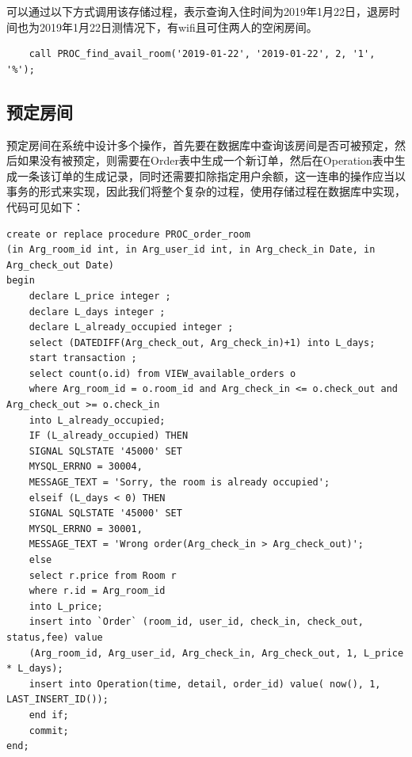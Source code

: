 \documentclass{myreport}
\begin{document}
可以通过以下方式调用该存储过程，表示查询入住时间为2019年1月22日，退房时间也为2019年1月22日测情况下，有wifi且可住两人的空闲房间。

\begin{verbatim}
    call PROC_find_avail_room('2019-01-22', '2019-01-22', 2, '1', '%');
\end{verbatim}

\subsection{预定房间}

预定房间在系统中设计多个操作，首先要在数据库中查询该房间是否可被预定，然后如果没有被预定，则需要在Order表中生成一个新订单，然后在Operation表中生成一条该订单的生成记录，同时还需要扣除指定用户余额，这一连串的操作应当以事务的形式来实现，因此我们将整个复杂的过程，使用存储过程在数据库中实现，代码可见如下：

\begin{verbatim}
create or replace procedure PROC_order_room
(in Arg_room_id int, in Arg_user_id int, in Arg_check_in Date, in Arg_check_out Date)
begin
    declare L_price integer ;
    declare L_days integer ;
    declare L_already_occupied integer ;
    select (DATEDIFF(Arg_check_out, Arg_check_in)+1) into L_days;
    start transaction ;
    select count(o.id) from VIEW_available_orders o
    where Arg_room_id = o.room_id and Arg_check_in <= o.check_out and Arg_check_out >= o.check_in
    into L_already_occupied;
    IF (L_already_occupied) THEN
    SIGNAL SQLSTATE '45000' SET
    MYSQL_ERRNO = 30004,
    MESSAGE_TEXT = 'Sorry, the room is already occupied';
    elseif (L_days < 0) THEN
    SIGNAL SQLSTATE '45000' SET
    MYSQL_ERRNO = 30001,
    MESSAGE_TEXT = 'Wrong order(Arg_check_in > Arg_check_out)';
    else
    select r.price from Room r
    where r.id = Arg_room_id
    into L_price;
    insert into `Order` (room_id, user_id, check_in, check_out, status,fee) value
    (Arg_room_id, Arg_user_id, Arg_check_in, Arg_check_out, 1, L_price * L_days);
    insert into Operation(time, detail, order_id) value( now(), 1, LAST_INSERT_ID());
    end if;
    commit;
end;  
\end{verbatim}
\end{document}
